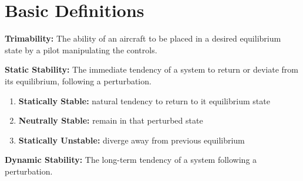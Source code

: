 \section{Basic Definitions}
\textbf{Trimability:} The ability of an aircraft to be placed in a desired equilibrium state by a pilot manipulating the controls.

\textbf{Static Stability:} The immediate tendency of a system to return or deviate from its equilibrium, following a perturbation.
\begin{enumerate}
  \item \textbf{Statically Stable:} natural tendency to return to it equilibrium state
  \item \textbf{Neutrally Stable:} remain in that perturbed state
  \item \textbf{Statically Unstable:} diverge away from previous equilibrium
\end{enumerate}

\textbf{Dynamic Stability:} The long-term tendency of a system following a perturbation.
